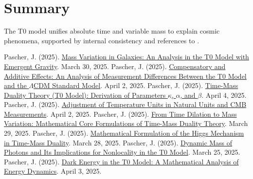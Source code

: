 \documentclass[a4paper,12pt]{article}
\theoremstyle{definition}
\theoremstyle{remark}
\begin{document}
	\section{Summary}
	
	The T0 model unifies absolute time and variable mass to explain cosmic phenomena, supported by internal consistency and references to \cite{pascher_galaxies_2025, pascher_params_2025, pascher_messdifferenzen_2025}.
	
	\begin{thebibliography}{99}
		 Pascher, J. (2025). \href{https://github.com/jpascher/T0-Time-Mass-Duality/tree/main/2/pdf/English/MassVarGalaxienEn.pdf}{Mass Variation in Galaxies: An Analysis in the T0 Model with Emergent Gravity}. March 30, 2025.
		 Pascher, J. (2025). \href{https://github.com/jpascher/T0-Time-Mass-Duality/tree/main/2/pdf/English/MessdifferenzenT0StandardEn.pdf}{Compensatory and Additive Effects: An Analysis of Measurement Differences Between the T0 Model and the \(\Lambda\)CDM Standard Model}. April 2, 2025.
		 Pascher, J. (2025). \href{https://github.com/jpascher/T0-Time-Mass-Duality/tree/main/2/pdf/English/ZeitMasseT0ParamsEn.pdf}{Time-Mass Duality Theory (T0 Model): Derivation of Parameters \(\kappa\), \(\alpha\), and \(\beta\)}. April 4, 2025.
		 Pascher, J. (2025). \href{https://github.com/jpascher/T0-Time-Mass-Duality/tree/main/2/pdf/English/NatEinheitenAlpha1En.pdf}{Adjustment of Temperature Units in Natural Units and CMB Measurements}. April 2, 2025.
		 Pascher, J. (2025). \href{https://github.com/jpascher/T0-Time-Mass-Duality/tree/main/2/pdf/English/MathZeitMasseLagrange.pdf}{From Time Dilation to Mass Variation: Mathematical Core Formulations of Time-Mass Duality Theory}. March 29, 2025.
		 Pascher, J. (2025). \href{https://github.com/jpascher/T0-Time-Mass-Duality/tree/main/2/pdf/English/MathHiggsZeitMasseEn.pdf}{Mathematical Formulation of the Higgs Mechanism in Time-Mass Duality}. March 28, 2025.
		 Pascher, J. (2025). \href{https://github.com/jpascher/T0-Time-Mass-Duality/tree/main/2/pdf/English/DynMassePhotonenNichtlokalEn.pdf}{Dynamic Mass of Photons and Its Implications for Nonlocality in the T0 Model}. March 25, 2025.
		 Pascher, J. (2025). \href{https://github.com/jpascher/T0-Time-Mass-Duality/tree/main/2/pdf/English/MathEnergiedynamikEn.pdf}{Dark Energy in the T0 Model: A Mathematical Analysis of Energy Dynamics}. April 3, 2025.
	\end{thebibliography}
	
\end{document}
